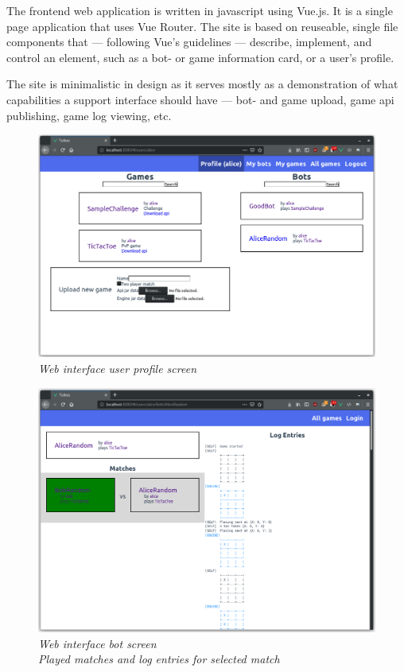 	The frontend web application is written in javascript using Vue.js. It is a single page application that uses Vue Router. 
	The site is based on reuseable, single file components that --- following Vue's guidelines --- describe, implement, and control an element, such as a bot- or game information card, or a user's profile.
	
	The site is minimalistic in design as it serves mostly as a demonstration of what capabilities a support interface should have --- bot- and game upload, game api publishing, game log viewing, etc.

	\vfill
	\begin{figure}[!ht]
		\centering
		\includegraphics[width=150mm, keepaspectratio]{figures/profile.png}
		\caption*{\emph{Web interface user profile screen}} 
	\end{figure}
	\vfill

	\begin{figure}[!ht]
		\centering
		\includegraphics[width=150mm, keepaspectratio]{figures/match-log.png}
		\caption*{\emph{Web interface bot screen} \\ \emph{Played matches and log entries for selected match}} 
	\end{figure}

%













